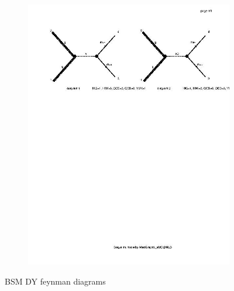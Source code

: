 \documentclass{CUP-JNL-DTM}%
\theoremstyle{definition}
\numberwithin{equation}{section}
\begin{document}
\begin{figure}[H]
\begin{subfigure}{.5\textwidth}
      \includegraphics[width=1\linewidth]{img/bsm_dy_diag2.jpg}
      \label{fig:bsm_dy2}
    \end{subfigure}
    \caption{BSM DY feynman diagrams}
    \label{fig:bsm_dy}
\end{figure}
\end{document}
